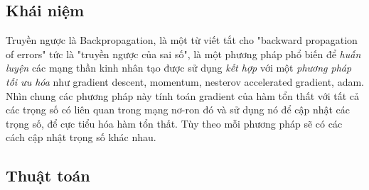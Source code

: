 \subsection{ Khái niệm}

Truyền ngược là Backpropagation, là một từ viết tắt cho "backward propagation of errors" tức là "truyền ngược của sai số", là một phương pháp phổ biến để \textit{huấn luyện} các mạng thần kinh nhân tạo được sử dụng \textit{kết hợp} với một \textit{phương pháp tối ưu hóa} như gradient descent, momentum, nesterov accelerated gradient, adam. Nhìn chung các phương pháp này tính toán gradient của hàm tổn thất với tất cả các trọng số có liên quan trong mạng nơ-ron đó và sử dụng nó để cập nhật các trọng số, để cực tiểu hóa hàm tổn thất. Tùy theo mỗi phương pháp sẽ có các cách cập nhật trọng số khác nhau.
\subsection{Thuật toán}
